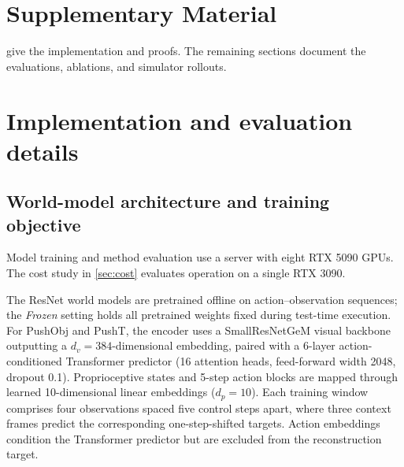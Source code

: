 \section*{Supplementary Material}
 give the implementation and proofs. The remaining sections document the evaluations, ablations, and simulator rollouts.

\section{Implementation and evaluation details}
\label{sec:implementation}
\subsection{World-model architecture and training objective}
Model training and method evaluation use a server with eight RTX 5090 GPUs. The cost study in \cref{sec:cost} evaluates operation on a single RTX 3090.

The ResNet world models are pretrained offline on action--observation sequences; the \emph{Frozen} setting holds all pretrained weights fixed during test-time execution. For PushObj and PushT, the encoder uses a SmallResNetGeM visual backbone outputting a $d_v=384$-dimensional embedding, paired with a 6-layer action-conditioned Transformer predictor (16 attention heads, feed-forward width 2048, dropout 0.1). Proprioceptive states and 5-step action blocks are mapped through learned 10-dimensional linear embeddings ($d_p=10$). Each training window comprises four observations spaced five control steps apart, where three context frames predict the corresponding one-step-shifted targets. Action embeddings condition the Transformer predictor but are excluded from the reconstruction target.

